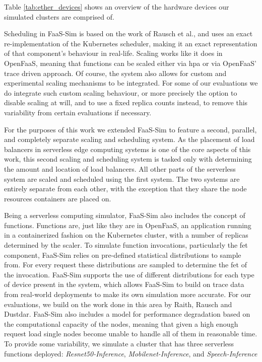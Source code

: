 \documentclass[draft,final]{vutinfth} %
\begin{document}
Table \ref{tab:ether_devices} shows an overview of the hardware devices our simulated clusters are comprised of.

Scheduling in FaaS-Sim is based on the work of Rausch et al.\cite{skippy}, and uses an exact re-implementation of the Kubernetes scheduler, making it an exact representation of that component's behaviour in real-life.
Scaling works like it does in OpenFaaS, meaning that functions can be scaled either via \gls{hpa} or via OpenFaaS' trace driven approach.
Of course, the system also allows for custom and experimental scaling mechanisms to be integrated.
For some of our evaluations we do integrate such custom scaling behaviour, or more precisely the option to disable scaling at will, and to use a fixed replica counts instead, to remove this variability from certain evaluations if necessary.

For the purposes of this work we extended FaaS-Sim to feature a second, parallel, and completely separate scaling and scheduling system.
As the placement of load balancers in serverless edge computing systems is one of the core aspects of this work, this second scaling and scheduling system is tasked only with determining the amount and location of load balancers.
All other parts of the serverless system are scaled and scheduled using the first system.
The two systems are entirely separate from each other, with the exception that they share the node resources containers are placed on.

Being a serverless computing simulator, FaaS-Sim also includes the concept of functions.
Functions are, just like they are in OpenFaaS, an application running in a containerized fashion on the Kubernetes cluster, with a number of replicas determined by the scaler.
To simulate function invocations, particularly the \gls{fet} component, FaaS-Sim relies on pre-defined statistical distributions to sample from.
For every request these distributions are sampled to determine the \gls{fet} of the invocation.
FaaS-Sim supports the use of different distributions for each type of device present in the system, which allows FaaS-Sim to build on trace data from real-world deployments to make its own simulation more accurate.
For our evaluations, we build on the work done in this area by Raith, Rausch and Dustdar\cite{philipp-da}.
FaaS-Sim also includes a model for performance degradation based on the computational capacity of the nodes, meaning that given a high enough request load single nodes become unable to handle all of them in reasonable time.
To provide some variability, we simulate a cluster that has three serverless functions deployed: \textit{Resnet50-Inference}, \textit{Mobilenet-Inference}, and \textit{Speech-Inference}
\end{document}

